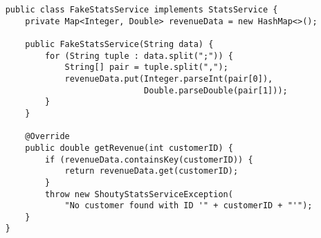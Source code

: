 \begin{verbatim}
    public class FakeStatsService implements StatsService {
        private Map<Integer, Double> revenueData = new HashMap<>();
    
        public FakeStatsService(String data) {
            for (String tuple : data.split(";")) {
                String[] pair = tuple.split(",");
                revenueData.put(Integer.parseInt(pair[0]), 
                                Double.parseDouble(pair[1]));
            }
        }
    
        @Override
        public double getRevenue(int customerID) {
            if (revenueData.containsKey(customerID)) {
                return revenueData.get(customerID);
            }
            throw new ShoutyStatsServiceException(
                "No customer found with ID '" + customerID + "'");
        }
    }
\end{verbatim}